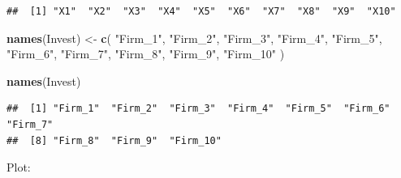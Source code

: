 \documentclass[
]{book}
\newenvironment{Shaded}{\begin{snugshade}}{\end{snugshade}}
\newcommand{\FunctionTok}[1]{\textcolor[rgb]{0.13,0.29,0.53}{\textbf{#1}}}
\newcommand{\NormalTok}[1]{#1}
\newcommand{\OtherTok}[1]{\textcolor[rgb]{0.56,0.35,0.01}{#1}}
\newcommand{\StringTok}[1]{\textcolor[rgb]{0.31,0.60,0.02}{#1}}
\begin{document}
\begin{verbatim}
##  [1] "X1"  "X2"  "X3"  "X4"  "X5"  "X6"  "X7"  "X8"  "X9"  "X10"
\end{verbatim}

\begin{Shaded}
\begin{Highlighting}[]
\FunctionTok{names}\NormalTok{(Invest) }\OtherTok{\textless{}{-}} \FunctionTok{c}\NormalTok{( }\StringTok{"Firm\_1"}\NormalTok{, }\StringTok{"Firm\_2"}\NormalTok{, }\StringTok{"Firm\_3"}\NormalTok{, }\StringTok{"Firm\_4"}\NormalTok{, }
                    \StringTok{"Firm\_5"}\NormalTok{, }\StringTok{"Firm\_6"}\NormalTok{, }\StringTok{"Firm\_7"}\NormalTok{, }\StringTok{"Firm\_8"}\NormalTok{, }
                    \StringTok{"Firm\_9"}\NormalTok{, }\StringTok{"Firm\_10"}\NormalTok{ )}

\FunctionTok{names}\NormalTok{(Invest)}
\end{Highlighting}
\end{Shaded}

\begin{verbatim}
##  [1] "Firm_1"  "Firm_2"  "Firm_3"  "Firm_4"  "Firm_5"  "Firm_6"  "Firm_7" 
##  [8] "Firm_8"  "Firm_9"  "Firm_10"
\end{verbatim}

Plot:
\end{document}
